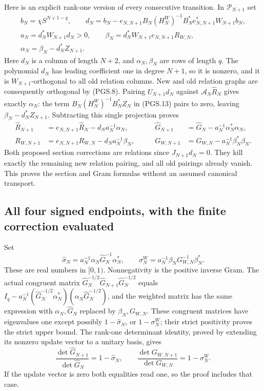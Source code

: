 Here is an explicit rank-one version of every consecutive transition.
In \(\mathcal P_{N+1}\) set
\[
\begin{gathered}
 b_N=\chi S^{N+1-q},\qquad
 d_N=b_N-e_{N,N+1}B_N(H_N^W)^{-1}
                 B_N^*e_{N,N+1}^*W_{N+1}b_N,\\
 a_N=d_N^*W_{N+1}d_N>0,\qquad
 \beta_N=d_N^*W_{N+1}e_{N,N+1}R_{W,N},\\
 \alpha_N=\beta_N-d_N^*Z_{N+1}.
\end{gathered}
\tag{PGS.25}\label{eq:pgs-step-data}
\]
Here \(d_N\) is a column of length \(N+2\), and
\(\alpha_N,\beta_N\) are rows of length \(q\). The polynomial
\(d_N\) has leading coefficient one in degree \(N+1\), so it
is nonzero, and it is \(W_{N+1}\)-orthogonal to all old relation
columns. New and old relation graphs are consequently orthogonal
by (PGS.8). Pairing \(U_{N+1}d_N\) against
\(\mathcal A_N\widehat R_N\) gives exactly \(\alpha_N\):
the term \(B_N(H_N^W)^{-1}B_N^*Z_N\) in (PGS.13) pairs to
zero, leaving \(\beta_N-d_N^*Z_{N+1}\).
Subtracting this single projection proves
\[
\begin{aligned}
 \widehat R_{N+1}
    &=e_{N,N+1}\widehat R_N-d_Na_N^{-1}\alpha_N,\qquad
 &\widehat G_{N+1}
    &=\widehat G_N-a_N^{-1}\alpha_N^*\alpha_N,\\
 R_{W,N+1}
    &=e_{N,N+1}R_{W,N}-d_Na_N^{-1}\beta_N,\qquad
 &G_{W,N+1}
    &=G_{W,N}-a_N^{-1}\beta_N^*\beta_N.
\end{aligned}
\tag{PGS.26}\label{eq:pgs-rank-one}
\]
Both proposed section corrections are relations since
\(J_{N+1}d_N=0\). They kill exactly the remaining new relation
pairing, and all old pairings already vanish. This proves the
section and Gram formulas without an assumed canonical transport.

\subsection{All four signed endpoints, with the finite correction evaluated}

Set
\[
 \widehat\sigma_N=
    a_N^{-1}\alpha_N\widehat G_N^{-1}\alpha_N^*,\qquad
 \sigma_N^W=a_N^{-1}\beta_NG_{W,N}^{-1}\beta_N^*.
\tag{PGS.27}\label{eq:pgs-sigmas}
\]
These are real numbers in \([0,1)\). Nonnegativity is the
positive inverse Gram. The actual congruent matrix
\(\widehat G_N^{-1/2}\widehat G_{N+1}\widehat G_N^{-1/2}\)
equals \(I_q-a_N^{-1}(\widehat G_N^{-1/2}\alpha_N^*)
(\alpha_N\widehat G_N^{-1/2})\), and the weighted matrix has
the same expression with \(\alpha_N,\widehat G_N\) replaced by
\(\beta_N,G_{W,N}\). These congruent matrices have eigenvalues
one except possibly \(1-\widehat\sigma_N\), or
\(1-\sigma_N^W\); their strict positivity proves the strict upper
bound. The rank-one determinant identity, proved by extending its
nonzero update vector to a unitary basis, gives
\[
 \frac{\det\widehat G_{N+1}}{\det\widehat G_N}
       =1-\widehat\sigma_N,\qquad
 \frac{\det G_{W,N+1}}{\det G_{W,N}}
       =1-\sigma_N^W.
\tag{PGS.28}\label{eq:pgs-step-determinants}
\]
If the update vector is zero both equalities read one, so the proof
includes that case.

